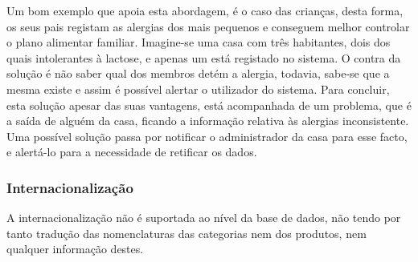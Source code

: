 Um bom exemplo que apoia esta abordagem, é o caso das crianças, desta forma, os seus pais registam as alergias dos mais pequenos e conseguem melhor controlar o plano alimentar familiar. Imagine-se uma casa com três habitantes, dois dos quais intolerantes à lactose, e apenas um está registado no sistema. O contra da solução é não saber qual dos membros detém a alergia, todavia, sabe-se que a mesma existe e assim é possível alertar o utilizador do sistema. Para concluir, esta solução apesar das suas vantagens, está acompanhada de um problema, que é a saída de alguém da casa, ficando a informação relativa às alergias inconsistente. Uma possível solução passa por notificar o administrador da casa para esse facto, e alertá-lo para a necessidade de retificar os dados.

\subsubsection{Internacionalização}

A internacionalização não é suportada ao nível da base de dados, não tendo por tanto tradução das nomenclaturas das categorias nem dos produtos, nem qualquer informação destes.  

